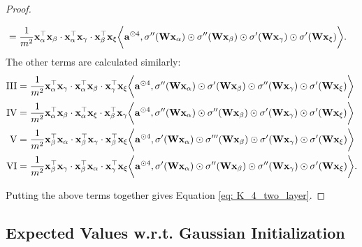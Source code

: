 \begin{proof}
\begin{enumerate}[itemsep=0mm]
\begin{align*}
			& = 	
			\frac{1}{m^2}{\mathbf{x}}_\alpha^\top{\mathbf{x}}_\beta \cdot{\mathbf{x}}_\alpha^\top{\mathbf{x}}_\gamma \cdot{\mathbf{x}}_\beta^\top{\mathbf{x}}_\xi \bigg\langle{\mathbf{a}}^{\odot 4} , \sigma''({\mathbf{W}} {\mathbf{x}}_\alpha) \odot \sigma''({\mathbf{W}} {\mathbf{x}}_\beta) \odot \sigma'({\mathbf{W}} {\mathbf{x}}_\gamma) \odot \sigma'({\mathbf{W}} {\mathbf{x}}_\xi) \bigg\rangle.
		\end{align*}
		The other terms are calculated similarly:
		\begin{align*}
			\RN{3} & = 
			\frac{1}{m^2}\rvx_\alpha^\top\rvx_\gamma \cdot\rvx_\alpha^\top\rvx_\beta \cdot\rvx_\gamma^\top\rvx_\xi \bigg\la\rva^{\odot 4} , \sigma''(\rmW \rvx_\alpha) \odot \sigma'(\rmW \rvx_\beta) \odot \sigma''(\rmW \rvx_\gamma) \odot \sigma'(\rmW \rvx_\xi) \bigg\ra\\
			\RN{4} & = 
			\frac{1}{m^2}\rvx_\alpha^\top\rvx_\beta \cdot\rvx_\alpha^\top\rvx_\xi \cdot\rvx_\beta^\top\rvx_\gamma \bigg\la\rva^{\odot 4} , \sigma''(\rmW \rvx_\alpha) \odot \sigma''(\rmW \rvx_\beta) \odot \sigma'(\rmW \rvx_\gamma) \odot \sigma'(\rmW \rvx_\xi) \bigg\ra\\ 
			\RN{5} & =
			\frac{1}{m^2}\rvx_\beta^\top\rvx_\alpha \cdot\rvx_\beta^\top\rvx_\gamma \cdot\rvx_\beta^\top\rvx_\xi \bigg\la\rva^{\odot 4} , \sigma'(\rmW \rvx_\alpha) \odot \sigma'''(\rmW \rvx_\beta) \odot \sigma'(\rmW \rvx_\gamma) \odot \sigma'(\rmW \rvx_\xi) \bigg\ra\\ 
			\RN{6} & = 
			\frac{1}{m^2}\rvx_\beta^\top\rvx_\gamma \cdot\rvx_\beta^\top\rvx_\alpha \cdot\rvx_\gamma^\top\rvx_\xi \bigg\la\rva^{\odot 4} , \sigma'(\rmW \rvx_\alpha) \odot \sigma''(\rmW \rvx_\beta) \odot \sigma''(\rmW \rvx_\gamma) \odot \sigma'(\rmW \rvx_\xi) \bigg\ra.
		\end{align*}
	\end{enumerate}
	Putting the above terms together gives Equation \eqref{eq: K_4_two_layer}.
\end{proof}

\subsection{Expected Values w.r.t. Gaussian Initialization}

